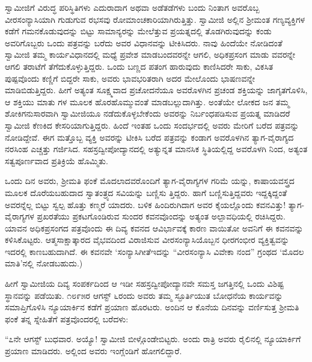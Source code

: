 ಸ್ವಾಮೀಜಿಗೆ ವಿರುದ್ಧ ಪರಿಸ್ಥಿತಿಗಳು ಎದುರಾದಾಗ ಅಥವಾ ಅಡೆತಡೆಗಳು ಬಂದು ನಿಂತಾಗ ಅವರೊಬ್ಬ ವೀರಸಂನ್ಯಾಸಿಯಾಗಿ ಗುಡುಗುವ ರಭಸವು ರೋಮಾಂಚಕಾರಿಯಾಗಿರುತ್ತಿತ್ತು. ಸ್ವಾಮೀಜಿ ಅಲ್ಲಿನ ಶ್ರೀಮಂತ ಗಣ್ಯವ್ಯಕ್ತಿಗಳ ಕಡೆಗೆ ಗಮನಕೊಡುವುದನ್ನು ಬಿಟ್ಟು ಸಾಮಾನ್ಯರನ್ನು ಮೇಲೆತ್ತುವ ಪ್ರಯತ್ನದಲ್ಲಿ ತೊಡಗಿರುವುದನ್ನು ಕಂಡು ಅವರಿಗೊಬ್ಬರು ಒಂದು ಪತ್ರವನ್ನು ಬರೆದು ಅವರ ವಿಧಾನವನ್ನು ಟೀಕಿಸಿದರು. ನಾವು ಹಿಂದೆಯೇ ನೋಡಿದಂತೆ ಸ್ವಾಮೀಜಿ ತಮ್ಮ ಕಾರ್ಯವಿಧಾನದಲ್ಲಿ ಮಧ್ಯೆ ಪ್ರವೇಶ ಮಾಡಬಂದವರನ್ನೇ ಆಗಲಿ, ಅಧಿಕಪ್ರಸಂಗ ಮಾಡು ವವರನ್ನೇ ಆಗಲಿ ತರಾಟೆಗೆ ತೆಗೆದುಕೊಳ್ಳುತ್ತಿದ್ದರು. ಒಂದು ಬಣ್ಣದ ಪತಂಗ ಹಾರುವುದು ಕಾಣಿಸಿದರೇ ಸಾಕು, ವಿಕಸಿತ ಪುಷ್ಪವೊಂದು ಕಣ್ಣಿಗೆ ಬಿದ್ದರೇ ಸಾಕು, ಅವರು ಭಾವಭರಿತರಾಗಿ ಅದರ ಮೇಲೊಂದು ಭಾಷಣವನ್ನೇ ಮಾಡಿಬಿಡುತ್ತಿದ್ದರು. ಹೀಗೆ ಅತ್ಯಂತ ಸೂಕ್ಷ್ಮವಾದ ಪ್ರಚೋದನೆಯೂ ಅವರೊಳಗಿನ ಪ್ರಚಂಡ ಶಕ್ತಿಯನ್ನು ಜಾಗೃತಗೊಳಿಸಿ, ಆ ಶಕ್ತಿಯು ಮಾತು ಗಳ ಮೂಲಕ ಹೊರಹೊಮ್ಮುವಂತೆ ಮಾಡಬಲ್ಲುದಾಗಿತ್ತು. ಅಂತೆಯೇ ಲೋಕದ ಜನ ತಮ್ಮ ಶೋಕಿಗನುಸಾರವಾಗಿ ಸ್ವಾಮೀಜಿಯೂ ನಡೆದುಕೊಳ್ಳಬೇಕೆಂದು ಅವರನ್ನು ನಿರ್ಬಂಧಪಡಿಸುವ ಪ್ರಯತ್ನ ಮಾಡಿದರೆ ಸ್ವಾಮೀಜಿ ಕೆಣಕಿದ ಕೇಸರಿಯಾಗುತ್ತಿದ್ದರು. ಹಿಂದೆ ಇಂತಹ ಒಂದು ಸಂದರ್ಭದಲ್ಲಿ ಅವರು ಮೇರಿಗೆ ಬರೆದ ಪತ್ರವನ್ನು ನೋಡಿದ್ದೇವೆ. ಈಗ ಮತ್ತೊಬ್ಬ ವ್ಯಕ್ತಿ ಅವರನ್ನು ಟೀಕಿಸಿ ಬರೆದ ಪತ್ರವನ್ನು ಕಂಡಾಗ ಅವರೊಳಗಿನ ತ್ಯಾಗ-ವೈರಾಗ್ಯದ ನರಸಿಂಹ ಎಚ್ಚತ್ತು ಗರ್ಜಿಸಿದ. ಸಹಸ್ರದ್ವೀಪೋದ್ಯಾನದಲ್ಲಿ ಅತ್ಯುನ್ನತ ಮಾನಸಿಕ ಸ್ಥಿತಿಯಲ್ಲಿದ್ದ ಅವರೊಳಗಿ ನಿಂದ, ಅತ್ಯಂತ ಸತ್ವಪೂರ್ಣವಾದ ಪ್ರತಿಕ್ರಿಯೆ ಹೊಮ್ಮಿತು.

ಒಂದು ದಿನ ಅವರು, ಶ್ರೀಮತಿ ಫಂಕೆ ಮೊದಲಾದವರೊಂದಿಗೆ ತ್ಯಾಗ-ವೈರಾಗ್ಯಗಳ ಗರಿಮೆ ಯನ್ನು, ಕಾಷಾಯವಸ್ತ್ರದ ಮೂಲಕ ದೊರೆಯಬಹುದಾದ ಸ್ವಾತಂತ್ರ್ಯದ ಸವಿಯನ್ನು ಬಣ್ಣಿಸು ತ್ತಿದ್ದರು. ಹಾಗೆ ಬಣ್ಣಿಸುತ್ತಿದ್ದವರು ಇದ್ದಕ್ಕಿದ್ದಂತೆ ಅವರನ್ನೆಲ್ಲ ಬಿಟ್ಟು ಸ್ವಲ್ಪ ಹೊತ್ತು ಕಣ್ಮರೆ ಯಾದರು. ಬಳಿಕ ಹಿಂದಿರುಗಿದಾಗ ಅವರ ಕೈಯಲ್ಲೊಂದು ಕವನವಿತ್ತು! ತ್ಯಾಗ-ವೈರಾಗ್ಯಗಳ ಪ್ರಖರತೆಯು ಪ್ರಕಟಗೊಂಡಿರುವ ಸುಂದರ ಕವನವೊಂದನ್ನು ಅತ್ಯಂತ ಅಲ್ಪಾವಧಿಯಲ್ಲಿ ರಚಿಸಿದ್ದರು. ಯಾವನ ಅಧಿಕಪ್ರಸಂಗದ ಪತ್ರವೊಂದು ಈ ದಿವ್ಯ ಕವನದ ಆವಿರ್ಭಾವಕ್ಕೆ ಕಾರಣ ವಾಯಿತೋ ಅವನಿಗೆ ಈ ಕವನವನ್ನು ಕಳಿಸಿಕೊಟ್ಟರು. ಆತ್ಮಸಾಕ್ಷಾತ್ಕಾರದ ವೈಭವದಿಂದ ವಿರಾಜಿಸುವ ವೀರಸಂನ್ಯಾಸಿಯೊಬ್ಬನ ಧೀರಗಂಭೀರ ವ್ಯಕ್ತಿತ್ವವನ್ನು ಇದರಲ್ಲಿ ಕಾಣಬಹುದಾಗಿದೆ. ಈ ಕವನವೇ ‘ಸಂನ್ಯಾಸಿಗೀತೆಇದನ್ನು “ವೀರಸಂನ್ಯಾಸಿ ವಿವೇಕಾ ನಂದ” ಗ್ರಂಥದ ‘ಮೊದಲ ಮಾತಿ’ನಲ್ಲಿ ನೋಡಬಹುದು.)

ಹೀಗೆ ಸ್ವಾಮೀಜಿಯ ದಿವ್ಯ ಸಂಪರ್ಕದಿಂದ ಆ ಇಡೀ ಸಹಸ್ರದ್ವೀಪೋದ್ಯಾನವೇ ಸಮಸ್ತ ಜಗತ್ತಿನಲ್ಲಿ ಒಂದು ವಿಶಿಷ್ಟ ಸ್ಥಾನವನ್ನು ಪಡೆಯಿತು. ೧೮೯೫ರ ಆಗಸ್ಟ್ ೬ರಂದು ಅವರು ತಮ್ಮ ಸ್ಫೂರ್ತಿಯುತ ಬೋಧನೆಯ ಕಾರ್ಯವನ್ನು ಸಮಾಪ್ತಿಗೊಳಿಸಿ ನ್ಯೂಯಾರ್ಕಿನ ಕಡೆಗೆ ಪ್ರಯಾಣ ಹೊರಟರು. ಅಂದಿನ ಆ ಕೊನೆಯ ದಿನವನ್ನು ವರ್ಣಿಸುತ್ತ ಶ್ರೀಮತಿ ಫಂಕೆ ತನ್ನ ಸ್ನೇಹಿತೆಗೆ ಪತ್ರವೊಂದರಲ್ಲಿ ಬರೆದಳು:

“೭ನೇ ಆಗಸ್ಟ್ ಬುಧವಾರ. ಅಯ್ಯೊ! ಸ್ವಾಮೀಜಿ ಬೀಳ್ಗೊಂಡೇಬಿಟ್ಟರು. ಅಂದು ರಾತ್ರಿ ಅವರು ರೈಲಿನಲ್ಲಿ ನ್ಯೂಯಾರ್ಕಿಗೆ ಪ್ರಯಾಣ ಮಾಡಿದರು. ಅಲ್ಲಿಂದ ಅವರು ಇಂಗ್ಲೆಂಡಿಗೆ ಹೋಗಲಿದ್ದಾರೆ.


